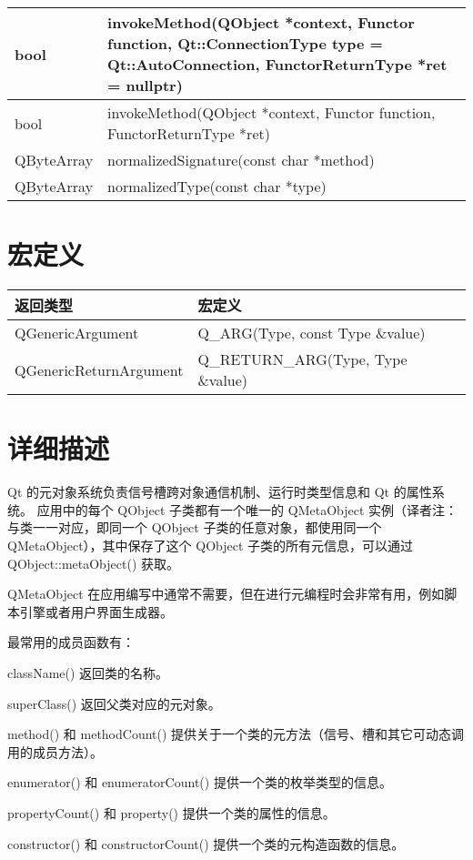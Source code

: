 \begin{longtable}[l]{|l|m{28em}|}
\hline
bool	&invokeMethod(QObject *context, Functor function, Qt::ConnectionType type = Qt::AutoConnection, FunctorReturnType *ret = nullptr) \\
\hline
bool	&invokeMethod(QObject *context, Functor function, FunctorReturnType *ret) \\
\hline
QByteArray&	normalizedSignature(const char *method) \\
\hline
QByteArray&	normalizedType(const char *type)\\
\hline
\end{longtable}

\section{宏定义}

\begin{tabular}{|l|l|}
\hline
返回类型	& 宏定义 \\
\hline
QGenericArgument	& Q\_ARG(Type, const Type \&value) \\
\hline
QGenericReturnArgument&	Q\_RETURN\_ARG(Type, Type \&value) \\
\hline
\end{tabular}



\section{详细描述}

Qt 的元对象系统负责信号槽跨对象通信机制、运行时类型信息和 Qt 的属性系统。
应用中的每个 QObject 子类都有一个唯一的 QMetaObject 实例（译者注：与类一一对应，即同一个 QObject 子类的任意对象，都使用同一个 QMetaObject），其中保存了这个 QObject 子类的所有元信息，可以通过 QObject::metaObject() 获取。

QMetaObject 在应用编写中通常不需要，但在进行元编程时会非常有用，例如脚本引擎或者用户界面生成器。

最常用的成员函数有：

\begin{compactitem}
\item className() 返回类的名称。
\item superClass() 返回父类对应的元对象。
\item method() 和 methodCount() 提供关于一个类的元方法（信号、槽和其它可动态调用的成员方法）。
\item enumerator() 和 enumeratorCount() 提供一个类的枚举类型的信息。
\item propertyCount() 和 property() 提供一个类的属性的信息。
\item constructor() 和 constructorCount() 提供一个类的元构造函数的信息。
\end{compactitem}


